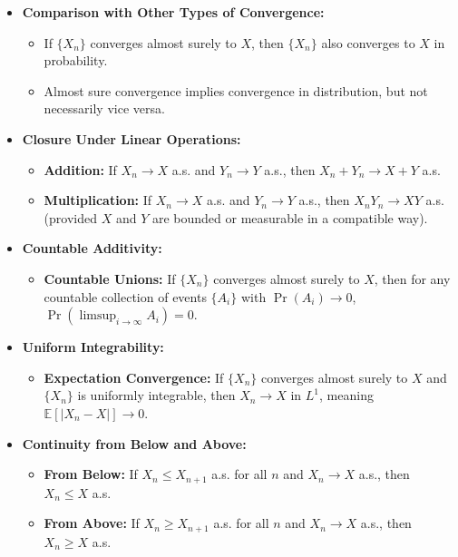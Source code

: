 \documentclass{report}
\begin{document}
\begin{itemize}
	\item \textbf{Comparison with Other Types of Convergence:}
	\begin{itemize}
		\item If $\{X_n\}$ converges almost surely to $X$, then $\{X_n\}$ also converges to $X$ in probability.
		\item Almost sure convergence implies convergence in distribution, but not necessarily vice versa.
	\end{itemize}
	
	\item \textbf{Closure Under Linear Operations:}
	\begin{itemize}
		\item \textbf{Addition:} If $X_n \to X$ a.s. and $Y_n \to Y$ a.s., then $X_n + Y_n \to X + Y$ a.s.
		\item \textbf{Multiplication:} If $X_n \to X$ a.s. and $Y_n \to Y$ a.s., then $X_n Y_n \to XY$ a.s. (provided $X$ and $Y$ are bounded or measurable in a compatible way).
	\end{itemize}
	
	\item \textbf{Countable Additivity:}
	\begin{itemize}
		\item \textbf{Countable Unions:} If $\{X_n\}$ converges almost surely to $X$, then for any countable collection of events $\{A_i\}$ with $\Pr(A_i) \to 0$, $\Pr(\limsup_{i \to \infty} A_i) = 0$.
	\end{itemize}
	
	\item \textbf{Uniform Integrability:}
	\begin{itemize}
		\item \textbf{Expectation Convergence:} If $\{X_n\}$ converges almost surely to $X$ and $\{X_n\}$ is uniformly integrable, then $X_n \to X$ in $L^1$, meaning $\mathbb{E}[|X_n - X|] \to 0$.
	\end{itemize}
	
	\item \textbf{Continuity from Below and Above:}
	\begin{itemize}
		\item \textbf{From Below:} If $X_n \leq X_{n+1}$ a.s. for all $n$ and $X_n \to X$ a.s., then $X_n \leq X$ a.s.
		\item \textbf{From Above:} If $X_n \geq X_{n+1}$ a.s. for all $n$ and $X_n \to X$ a.s., then $X_n \geq X$ a.s.
	\end{itemize}
	

\end{itemize}
\end{document}
